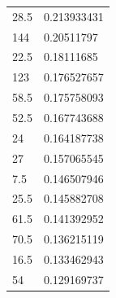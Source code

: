 \begin{longtable}{|l|l|}
 \rowcolor[HTML]{F8FF00} 
 28.5                                                    & 0.213933431                                                   \\
 \rowcolor[HTML]{F8FF00} 
 144                                                     & 0.20511797                                                    \\
 \rowcolor[HTML]{32CB00} 
 22.5                                                    & 0.18111685                                                    \\
 \rowcolor[HTML]{32CB00} 
 123                                                     & 0.176527657                                                   \\
 \rowcolor[HTML]{32CB00} 
 58.5                                                    & 0.175758093                                                   \\
 \rowcolor[HTML]{32CB00} 
 52.5                                                    & 0.167743688                                                   \\
 \rowcolor[HTML]{32CB00} 
 24                                                      & 0.164187738                                                   \\
 \rowcolor[HTML]{32CB00} 
 27                                                      & 0.157065545                                                   \\
 \rowcolor[HTML]{32CB00} 
 7.5                                                     & 0.146507946                                                   \\
 \rowcolor[HTML]{32CB00} 
 25.5                                                    & 0.145882708                                                   \\
 \rowcolor[HTML]{32CB00} 
 61.5                                                    & 0.141392952                                                   \\
 \rowcolor[HTML]{32CB00} 
 70.5                                                    & 0.136215119                                                   \\
 \rowcolor[HTML]{32CB00} 
 16.5                                                    & 0.133462943                                                   \\
 \rowcolor[HTML]{32CB00} 
 54                                                      & 0.129169737                                                   \\

\end{longtable}
